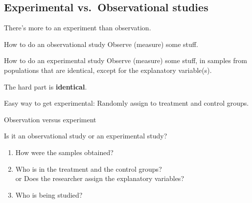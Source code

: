 \subsection{Experimental vs.\ Observational studies}

\begin{frame}{There's more to an experiment than observation.}

  \begin{block}{How to do an observational study}
    \alert{Observe} (measure) some stuff.
  \end{block}

  \vspace{2em}

  \begin{block}{How to do an experimental study}
    Observe (measure) some stuff, 
    in samples from populations that are \alert{identical},
    except for the explanatory variable(s).
  \end{block}

  \vspace{2em}

  The hard part is \textbf{identical}.

  \vspace{2em}

  \alert{Easy way to get experimental:}
  Randomly assign to treatment and control groups.

\end{frame}

%
\begin{frame}{Observation versus experiment}

  Is it an observational study or an experimental study?
  \begin{enumerate}

    \item How were the samples obtained?

    \item Who is in the treatment and the control groups? \\
      \alert{or} Does the researcher assign the explanatory variables?

    \item Who is being studied?

  \end{enumerate}

\end{frame}

%



